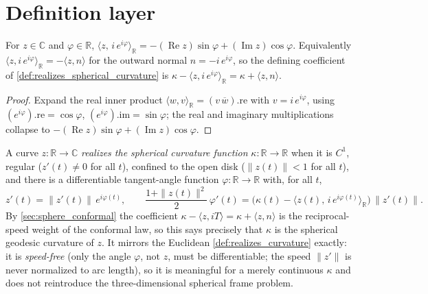 \section{Definition layer}
\label{sec:sphere_defs}

\begin{lemma}
  \label{lem:sphere_normal_inner_eq}
  For $z\in\mathbb C$ and $\varphi\in\mathbb R$,
  $\langle z,\, i\,e^{i\varphi}\rangle_{\mathbb R}
   =-(\operatorname{Re}z)\sin\varphi+(\operatorname{Im}z)\cos\varphi$.
  Equivalently $\langle z, i\,e^{i\varphi}\rangle_{\mathbb R}=-\langle z,n\rangle$ for the
  outward normal $n=-i\,e^{i\varphi}$, so the defining coefficient of
  \cref{def:realizes_spherical_curvature} is
  $\kappa-\langle z,i\,e^{i\varphi}\rangle_{\mathbb R}=\kappa+\langle z,n\rangle$.
\end{lemma}

\begin{proof}

\leanok
  Expand the real inner product $\langle w,v\rangle_{\mathbb R}=(v\,\overline w).\mathrm{re}$
  with $v=i\,e^{i\varphi}$, using
  $(e^{i\varphi}).\mathrm{re}=\cos\varphi$, $(e^{i\varphi}).\mathrm{im}=\sin\varphi$; the
  real and imaginary multiplications collapse to
  $-(\operatorname{Re}z)\sin\varphi+(\operatorname{Im}z)\cos\varphi$.
\end{proof}

\begin{definition}
  \label{def:realizes_spherical_curvature}
  A curve $z:\mathbb R\to\mathbb C$ \emph{realizes the spherical curvature function}
  $\kappa:\mathbb R\to\mathbb R$ when it is $C^1$, regular ($z'(t)\neq 0$ for all $t$),
  confined to the open disk ($\|z(t)\|<1$ for all $t$), and there is a differentiable
  tangent-angle function $\varphi:\mathbb R\to\mathbb R$ with, for all $t$,
  \[
    z'(t)=\|z'(t)\|\,e^{i\varphi(t)},\qquad
    \frac{1+\|z(t)\|^2}{2}\,\varphi'(t)
      =\bigl(\kappa(t)-\langle z(t),\,i\,e^{i\varphi(t)}\rangle_{\mathbb R}\bigr)\,\|z'(t)\| .
  \]
  By \cref{sec:sphere_conformal} the coefficient $\kappa-\langle z,iT\rangle
  =\kappa+\langle z,n\rangle$ is the reciprocal-speed weight of the conformal law, so this
  says precisely that $\kappa$ is the spherical geodesic curvature of $z$. It mirrors the
  Euclidean \cref{def:realizes_curvature} exactly: it is \emph{speed-free} (only the angle
  $\varphi$, not $z$, must be differentiable; the speed $\|z'\|$ is never normalized to arc
  length), so it is meaningful for a merely continuous $\kappa$ and does not reintroduce
  the three-dimensional spherical frame problem.
\end{definition}

